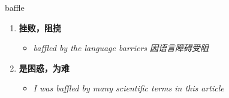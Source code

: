 
\begin{frame}
{\huge baffle}
\begin{center}
\begin{enumerate}\Large
  \item \textbf{挫败，阻挠}
  \begin{itemize}
    \item \em{\Large{baffled by the language barriers 因语言障碍受阻}}
  \end{itemize}
  \item \textbf{是困惑，为难}
  \begin{itemize}
    \item \em{\Large{I was baffled by many scientific terms in this article}}
  \end{itemize}
\end{enumerate}
\end{center}
\end{frame}
